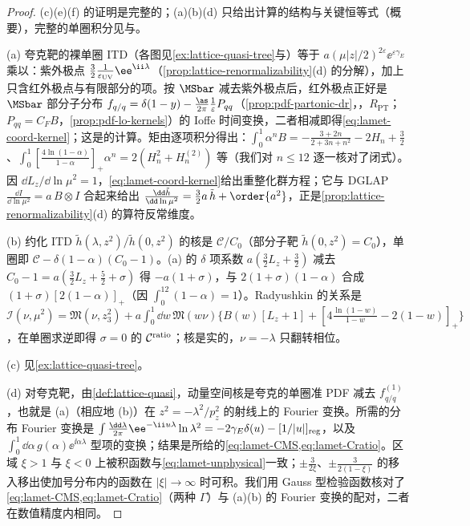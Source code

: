 \begin{proof}
(c)(e)(f) 的证明是完整的；(a)(b)(d) 只给出计算的结构与关键恒等式（概要），完整的单圈积分见\cite[第~III~节与附录~B]{IzubuchiEtAl2018}与\cite{Radyushkin:2018cvn}。

(a) 夸克靶的裸单圈 ITD（各图见\cref{ex:lattice-quasi-tree}与\cite[第~III~节]{IzubuchiEtAl2018}）等于 $a(\mu|z|/2)^{2\varepsilon}\ee^{\varepsilon\gamma_E}$ 乘以：紫外极点 $\frac32\frac1{\varepsilon_{\rm UV}}\ee^{\ii\lambda}$（\cref{prop:lattice-renormalizability}(d) 的分解），加上只含红外极点与有限部分的项。按 $\MSbar$ 减去紫外极点后，红外极点正好是 $\MSbar$ 部分子分布 $f_{q/q}=\delta(1-y)-\frac{\as}{2\pi}\frac1{\varepsilon}P_{qq}$（\cref{prop:pdf-partonic-dr}，\tagR，$R_{\mathrm{PT}}$；$P_{qq}=C_F B$，\cref{prop:pdf-lo-kernels}）的 Ioffe 时间变换，二者相减即得\cref{eq:lamet-coord-kernel}；这是\cite{IzubuchiEtAl2018,Radyushkin:2018cvn,Zhang:2018ggy}的计算。矩由逐项积分得出：$\int_0^1\alpha^nB=-\frac{3+2n}{2+3n+n^2}-2H_n+\frac32$、$\int_0^1[\frac{4\ln(1-\alpha)}{1-\alpha}]_+\alpha^n=2(H_n^2+H_n^{(2)})$ 等（我们对 $n\le12$ 逐一核对了闭式）。因 $\dd L_z/\dd\ln\mu^2=1$，\cref{eq:lamet-coord-kernel}给出重整化群方程；它与 DGLAP $\frac{\dd I}{\dd\ln\mu^2}=a\,B\otimes I$ 合起来给出 $\frac{\dd\tilde h}{\dd\ln\mu^2}=\frac32a\,\tilde h+\order{a^2}$，正是\cref{prop:lattice-renormalizability}(d) 的算符反常维度。

(b) 约化 ITD $\tilde h(\lambda,z^2)/\tilde h(0,z^2)$ 的核是 $\mathcal C/C_0$（部分子靶 $\tilde h(0,z^2)=C_0$），单圈即 $\mathcal C-\delta(1-\alpha)(C_0-1)$。(a) 的 $\delta$ 项系数 $a(\frac32L_z+\frac32)$ 减去 $C_0-1=a(\frac32L_z+\frac52+\sigma)$ 得 $-a(1+\sigma)$，与 $2(1+\sigma)(1-\alpha)$ 合成 $(1+\sigma)[2(1-\alpha)]_+$（因 $\int_0^12(1-\alpha)=1$）。Radyushkin 的关系\cite{Radyushkin:2018cvn}是 $\mathcal I(\nu,\mu^2)=\mathfrak M(\nu,z_3^2)+a\int_0^1\dd w\,\mathfrak M(w\nu)\{B(w)[L_z+1]+[4\frac{\ln(1-w)}{1-w}-2(1-w)]_+\}$，在单圈求逆即得 $\sigma=0$ 的 $\mathcal C^{\rm ratio}$；核是实的，$\nu=-\lambda$ 只翻转相位。

(c) 见\cref{ex:lattice-quasi-tree}。

(d) 对夸克靶，由\cref{def:lattice-quasi}，动量空间核是夸克的单圈准 PDF 减去 $f^{(1)}_{q/q}$，也就是 (a)（相应地 (b)）在 $z^2=-\lambda^2/p_z^2$ 的射线上的 Fourier 变换。所需的分布 Fourier 变换是 $\int\frac{\dd\lambda}{2\pi}\ee^{-\ii u\lambda}\ln\lambda^2=-2\gamma_E\delta(u)-[1/|u|]_{\rm reg}$，以及 $\int_0^1\dd\alpha\,g(\alpha)\ee^{\ii\alpha\lambda}$ 型项的变换；结果是\cite[第~III~节]{IzubuchiEtAl2018}所给的\cref{eq:lamet-CMS,eq:lamet-Cratio}。区域 $\xi>1$ 与 $\xi<0$ 上被积函数与\cref{eq:lamet-unphysical}一致；$\pm\frac3{2\xi}$、$\pm\frac3{2(1-\xi)}$ 的移入移出使加号分布内的函数在 $|\xi|\to\infty$ 时可积。我们用 Gauss 型检验函数核对了\cref{eq:lamet-CMS,eq:lamet-Cratio}（两种 $\Gamma$）与 (a)(b) 的 Fourier 变换的配对，二者在数值精度内相同。


\end{proof}
